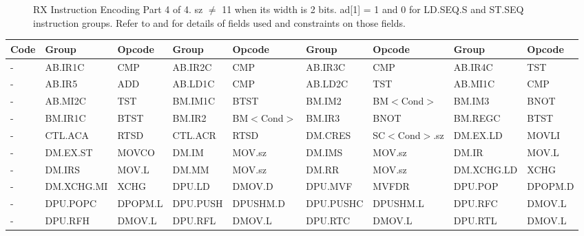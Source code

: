 \begin{figure}
\begin{center}
\end{center}
\captionsetup{font=scriptsize, labelfont=scriptsize}
\caption{RX Instruction Encoding Part 4 of 4. sz $\ne$ 11 when its width is 2 bits. ad[1] = 1 and 0 for LD.SEQ.S and 
ST.SEQ instruction groups. Refer to \protect{} 
and \protect{} for details of fields used and constraints on those 
fields.}
\end{figure}


\clearpage
\begin{table}
\begin{center}
\tiny
\begin{tabular}{l|ll|ll|ll|ll}
\hline
Code & Group      & Opcode   & Group     & Opcode          & Group      & Opcode          & Group      & Opcode    \\ \hline
-    & AB.IR1C    & CMP      & AB.IR2C   & CMP             & AB.IR3C    & CMP             & AB.IR4C    & TST       \\
-    & AB.IR5     & ADD      & AB.LD1C   & CMP             & AB.LD2C    & TST             & AB.MI1C    & CMP       \\
-    & AB.MI2C    & TST      & BM.IM1C   & BTST            & BM.IM2     & BM$<$Cond$>$    & BM.IM3     & BNOT      \\
-    & BM.IR1C    & BTST     & BM.IR2    & BM$<$Cond$>$    & BM.IR3     & BNOT            & BM.REGC    & BTST      \\
-    & CTL.ACA    & RTSD     & CTL.ACR   & RTSD            & DM.CRES    & SC$<$Cond$>$.sz & DM.EX.LD   & MOVLI     \\
-    & DM.EX.ST   & MOVCO    & DM.IM     & MOV.sz          & DM.IMS     & MOV.sz          & DM.IR      & MOV.L     \\
-    & DM.IRS     & MOV.L    & DM.MM     & MOV.sz          & DM.RR      & MOV.sz          & DM.XCHG.LD & XCHG      \\
-    & DM.XCHG.MI & XCHG     & DPU.LD    & DMOV.D          & DPU.MVF    & MVFDR           & DPU.POP    & DPOPM.D   \\
-    & DPU.POPC   & DPOPM.L  & DPU.PUSH  & DPUSHM.D        & DPU.PUSHC  & DPUSHM.L        & DPU.RFC    & DMOV.L    \\
-    & DPU.RFH    & DMOV.L   & DPU.RFL   & DMOV.L          & DPU.RTC    & DMOV.L          & DPU.RTL    & DMOV.L    \\

\end{tabular}
\end{center}
\end{table}
